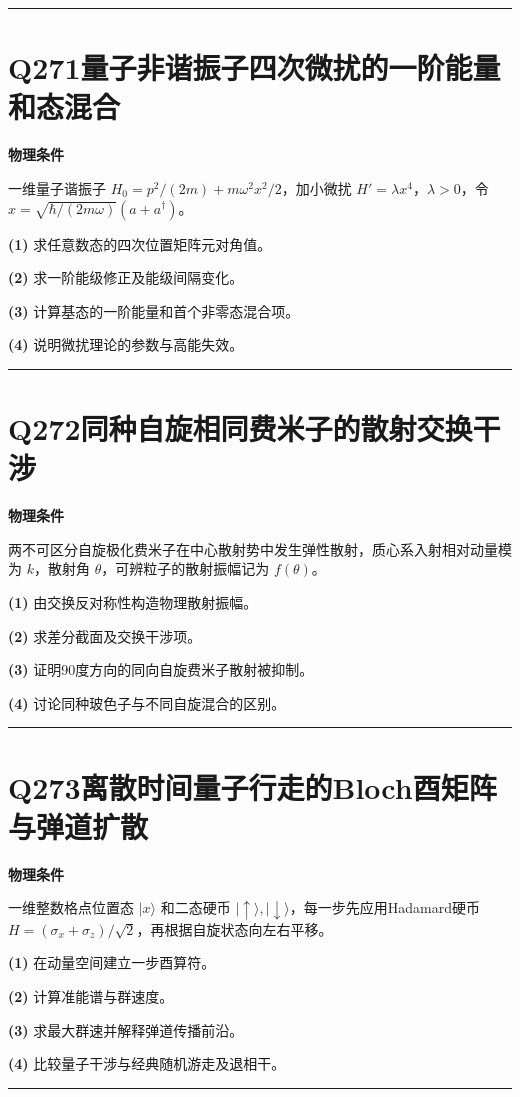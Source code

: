 \documentclass[UTF8,a4paper,11pt,oneside,openany]{ctexbook}
\begin{document}
\par\bigskip\hrule\bigskip
\section*{Q271\quad 量子非谐振子四次微扰的一阶能量和态混合}
\textbf{物理条件}\par 一维量子谐振子 \(H_0=p^2/(2m)+m\omega^2x^2/2\)，加小微扰 \(H'=\lambda x^4\)，\(\lambda>0\)，令 \(x=\sqrt{\hbar/(2m\omega)}(a+a^\dagger)\)。
\par\noindent\textbf{(1)} 求任意数态的四次位置矩阵元对角值。
\par\noindent\textbf{(2)} 求一阶能级修正及能级间隔变化。
\par\noindent\textbf{(3)} 计算基态的一阶能量和首个非零态混合项。
\par\noindent\textbf{(4)} 说明微扰理论的参数与高能失效。

\par\bigskip\hrule\bigskip
\section*{Q272\quad 同种自旋相同费米子的散射交换干涉}
\textbf{物理条件}\par 两不可区分自旋极化费米子在中心散射势中发生弹性散射，质心系入射相对动量模为 \(k\)，散射角 \(\theta\)，可辨粒子的散射振幅记为 \(f(\theta)\)。
\par\noindent\textbf{(1)} 由交换反对称性构造物理散射振幅。
\par\noindent\textbf{(2)} 求差分截面及交换干涉项。
\par\noindent\textbf{(3)} 证明90度方向的同向自旋费米子散射被抑制。
\par\noindent\textbf{(4)} 讨论同种玻色子与不同自旋混合的区别。

\par\bigskip\hrule\bigskip
\section*{Q273\quad 离散时间量子行走的Bloch酉矩阵与弹道扩散}
\textbf{物理条件}\par 一维整数格点位置态 \(|x\rangle\) 和二态硬币 \(|\uparrow\rangle,|\downarrow\rangle\)，每一步先应用Hadamard硬币 \(H=(\sigma_x+\sigma_z)/\sqrt2\)，再根据自旋状态向左右平移。
\par\noindent\textbf{(1)} 在动量空间建立一步酉算符。
\par\noindent\textbf{(2)} 计算准能谱与群速度。
\par\noindent\textbf{(3)} 求最大群速并解释弹道传播前沿。
\par\noindent\textbf{(4)} 比较量子干涉与经典随机游走及退相干。

\par\bigskip\hrule\bigskip
\end{document}
